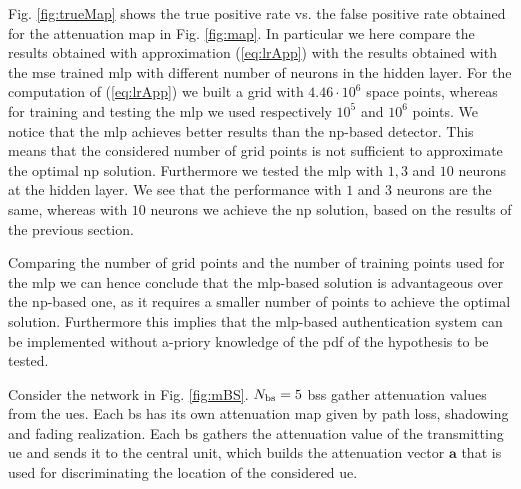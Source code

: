 \documentclass[draftcls,onecolumn,12pt]{IEEEtran}
\begin{document}
Fig. \ref{fig:trueMap} shows the true positive rate vs. the false positive rate obtained for the attenuation map in Fig. \ref{fig:map}. In particular we here compare the results obtained with approximation (\ref{eq:lrApp}) with the results obtained with the \ac{mse} trained \ac{mlp} with different number of neurons in the hidden layer.
For the computation of (\ref{eq:lrApp}) we built a grid with $4.46 \cdot 10^6$ space points, whereas for training and testing the \ac{mlp} we used respectively $10^5$ and $10^6$ points. We notice that the \ac{mlp} achieves better results than the \ac{np}-based detector. This means that the considered number of grid points is not sufficient to approximate the optimal \ac{np} solution. Furthermore we tested the \ac{mlp} with $1,3$ and $10$ neurons at the hidden layer. We see that the performance with $1$ and $3$ neurons are the same, whereas with $10$ neurons we achieve the \ac{np} solution, based on the results of the previous section. 

Comparing the number of grid points and the number of training points used for the \ac{mlp} we can hence conclude that the \ac{mlp}-based solution is advantageous over the \ac{np}-based one, as it requires a smaller number of points to achieve the optimal solution. Furthermore this implies that the \ac{mlp}-based authentication system can be implemented without a-priory knowledge of the \ac{pdf} of the hypothesis to be tested.

Consider the network in Fig. \ref{fig:mBS}. $N_{\rm bs}=5$ \acp{bs} gather attenuation values from the \acp{ue}. Each \ac{bs} has its own attenuation map given by path loss, shadowing and fading realization. Each \ac{bs} gathers the attenuation value of the transmitting \ac{ue} and sends it to the central unit, which builds the attenuation vector $\bm{a}$ that is used for discriminating the location of the considered \ac{ue}.
\end{document}
